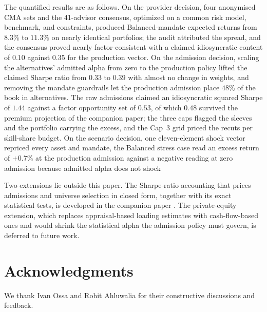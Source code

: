 \documentclass[pdftex,12pt,a4paper]{article}
\begin{document}
The quantified results are as follows. On the provider decision, four anonymised CMA sets and the 41-advisor consensus, optimized on a common risk model, benchmark, and constraints, produced Balanced-mandate expected returns from $8.3\%$ to $11.3\%$ on nearly identical portfolios; the audit attributed the spread, and the consensus proved nearly factor-consistent with a claimed idiosyncratic content of $0.10$ against $0.35$ for the production vector. On the admission decision, scaling the alternatives' admitted alpha from zero to the production policy lifted the claimed Sharpe ratio from $0.33$ to $0.39$ with almost no change in weights, and removing the mandate guardrails let the production admission place $48\%$ of the book in alternatives. The raw admissions claimed an idiosyncratic squared Sharpe of $1.44$ against a factor opportunity set of $0.53$, of which $0.48$ survived the premium projection of the companion paper; the three caps flagged the sleeves and the portfolio carrying the excess, and the Cap~3 grid priced the recuts per skill-share budget. On the scenario decision, one eleven-element shock vector repriced every asset and mandate, the Balanced stress case read an excess return of $+0.7\%$ at the production admission against a negative reading at zero admission because admitted alpha does not shock

Two extensions lie outside this paper. The Sharpe-ratio accounting that prices admissions and universe selection in closed form, together with its exact statistical tests, is developed in the companion paper \citep{SeppKastenholzFAJ2026}. The private-equity extension, which replaces appraisal-based loading estimates with cash-flow-based ones and would shrink the statistical alpha the admission policy must govern, is deferred to future work.

\sectionfont{\MakeUppercase}
\section*{Acknowledgments}
We thank Ivan Ossa and Rohit Ahluwalia for their constructive discussions and feedback.
\newpage
\sectionfont{\MakeUppercase}
\end{document}
